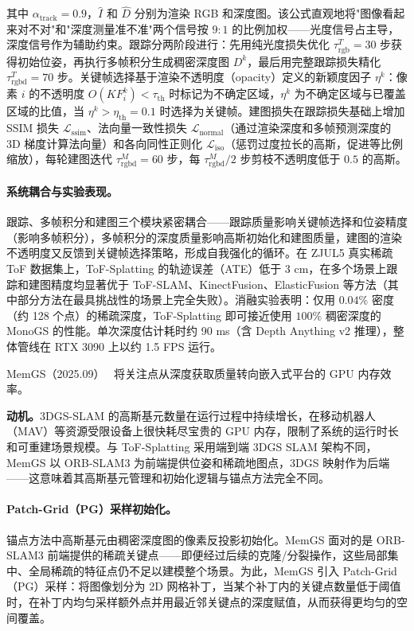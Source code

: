 其中 $\alpha_{\text{track}} = 0.9$，$\hat{I}$ 和 $\hat{D}$ 分别为渲染 RGB 和深度图。该公式直观地将"图像看起来对不对"和"深度测量准不准"两个信号按 $9:1$ 的比例加权——光度信号占主导，深度信号作为辅助约束。跟踪分两阶段进行：先用纯光度损失优化 $\tau_{\text{rgb}}^T = 30$ 步获得初始位姿，再执行多帧积分生成稠密深度图 $D^k$，最后用完整跟踪损失精化 $\tau_{\text{rgbd}}^T = 70$ 步。关键帧选择基于渲染不透明度（opacity）定义的新颖度因子 $\eta^k$：像素 $i$ 的不透明度 $O(KF^k_i) < \tau_{\text{th}}$ 时标记为不确定区域，$\eta^k$ 为不确定区域与已覆盖区域的比值，当 $\eta^k > \eta_{\text{th}} = 0.1$ 时选择为关键帧。建图损失在跟踪损失基础上增加 SSIM 损失 $\mathcal{L}_{\text{ssim}}$、法向量一致性损失 $\mathcal{L}_{\text{normal}}$（通过渲染深度和多帧预测深度的 3D 梯度计算法向量）和各向同性正则化 $\mathcal{L}_{\text{iso}}$（惩罚过度拉长的高斯，促进等比例缩放），每轮建图迭代 $\tau_{\text{rgbd}}^M = 60$ 步，每 $\tau_{\text{rgbd}}^M / 2$ 步剪枝不透明度低于 $0.5$ 的高斯。

\paragraph{系统耦合与实验表现。}跟踪、多帧积分和建图三个模块紧密耦合——跟踪质量影响关键帧选择和位姿精度（影响多帧积分），多帧积分的深度质量影响高斯初始化和建图质量，建图的渲染不透明度又反馈到关键帧选择策略，形成自我强化的循环。在 ZJUL5 真实稀疏 ToF 数据集上，ToF-Splatting 的轨迹误差（ATE）低于 3 cm，在多个场景上跟踪和建图精度均显著优于 ToF-SLAM、KinectFusion、ElasticFusion 等方法（其中部分方法在最具挑战性的场景上完全失败）。消融实验表明：仅用 $0.04\%$ 密度（约 128 个点）的稀疏深度，ToF-Splatting 即可接近使用 $100\%$ 稠密深度的 MonoGS 的性能。单次深度估计耗时约 90 ms（含 Depth Anything v2 推理），整体管线在 RTX 3090 上以约 1.5 FPS 运行。

MemGS（2025.09）~\cite{2509_13536} 将关注点从深度获取质量转向嵌入式平台的 GPU 内存效率。

\textbf{动机。}3DGS-SLAM 的高斯基元数量在运行过程中持续增长，在移动机器人（MAV）等资源受限设备上很快耗尽宝贵的 GPU 内存，限制了系统的运行时长和可重建场景规模。与 ToF-Splatting 采用端到端 3DGS SLAM 架构不同，MemGS 以 ORB-SLAM3 为前端提供位姿和稀疏地图点，3DGS 映射作为后端——这意味着其高斯基元管理和初始化逻辑与锚点方法完全不同。

\paragraph{Patch-Grid（PG）采样初始化。}锚点方法中高斯基元由稠密深度图的像素反投影初始化。MemGS 面对的是 ORB-SLAM3 前端提供的稀疏关键点——即便经过后续的克隆/分裂操作，这些局部集中、全局稀疏的特征点仍不足以建模整个场景。为此，MemGS 引入 Patch-Grid（PG）采样：将图像划分为 2D 网格补丁，当某个补丁内的关键点数量低于阈值时，在补丁内均匀采样额外点并用最近邻关键点的深度赋值，从而获得更均匀的空间覆盖。

